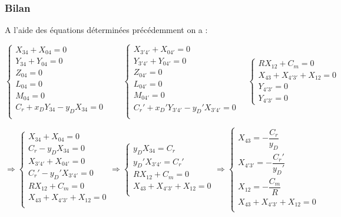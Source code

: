 \documentclass[10pt]{article}
\begin{document}
\subsubsection*{Bilan}
A l'aide des équations déterminées précédemment on a : 

$$
\left\{
\begin{array}{l}
{X_{34}}+{X_{04}}=0 \\
{Y_{34}}+{Y_{04}}=0 \\
{Z_{04}}=0 \\
{L_{04}}=0\\
{M_{04}}=0\\
{C_r}+{x_DY_{34}-y_DX_{34}}=0 \\
\end{array}
\right.
\quad \quad
\left\{
\begin{array}{l}
{X_{3'4'}}+{X_{04'}}=0 \\
{Y_{3'4'}}+{Y_{04'}}=0 \\
{Z_{04'}}=0 \\
{L_{04'}}=0\\
{M_{04'}}=0\\
{C_r'}+{x_D'Y_{3'4'}-y_D'X_{3'4'}}=0 \\
\end{array}
\right.
\quad 
\left\{
\begin{array}{l}
R X_{12} + C_m = 0\\
X_{43}+X_{4'3'}+X_{12}=0\\
Y_{4'3'}=0\\
Y_{4'3'}=0
\end{array}
\right.
$$


$$
\Longrightarrow
\left\{
\begin{array}{l}
{X_{34}}+{X_{04}}=0 \\
{C_r}-y_DX_{34}=0 \\
{X_{3'4'}}+{X_{04'}}=0 \\
{C_r'}-y_D'X_{3'4'}=0 \\
R X_{12} + C_m = 0\\
X_{43}+X_{4'3'}+X_{12}=0\\
\end{array}
\right.
\Longrightarrow
\left\{
\begin{array}{l}
y_DX_{34}={C_r} \\
y_D'X_{3'4'}={C_r'} \\
R X_{12} + C_m = 0\\
X_{43}+X_{4'3'}+X_{12}=0\\
\end{array}
\right.
\Longrightarrow
\left\{
\begin{array}{l}
X_{43}=-\dfrac{C_r}{y_D} \\
X_{4'3'}=-\dfrac{C_r'}{y_D'} \\
X_{12} = -\dfrac{C_m}{R}\\
X_{43}+X_{4'3'}+X_{12}=0\\
\end{array}
\right.
$$
\end{document}
